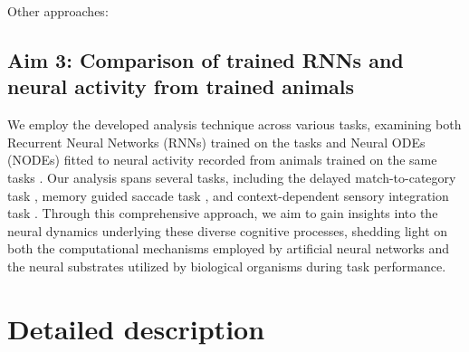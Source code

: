 \documentclass[12pt,letterpaper, onecolumn]{article}
\theoremstyle{definition}
\theoremstyle{remark}
\begin{document}
Other approaches:
\citep{turner2021charting, turner2023}
\citep{casey1996}
\citep{valente2022extracting}

\subsection*{Aim 3: Comparison of trained RNNs and neural activity from trained animals}
We employ the developed analysis technique across various tasks, examining both Recurrent Neural Networks (RNNs) trained on the tasks and Neural ODEs (NODEs) fitted to neural activity recorded from animals trained on the same tasks \citep{zhao2016, pandarinath2018inferring, kim2021inferring}.
 Our analysis spans several tasks, including the delayed match-to-category task \citep{chaisangmongkon2017computing},
 memory guided saccade task \citep{wimmer2014},
  and context-dependent sensory integration task \citep{mante2013context}.
   Through this comprehensive approach, we aim to gain insights into the neural dynamics underlying these diverse cognitive processes, shedding light on both the computational mechanisms employed by artificial neural networks and the neural substrates utilized by biological organisms during task performance.


\newpage
\section{Detailed description}


\newpage
\printbibliography
\end{document}
